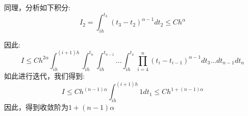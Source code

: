 \documentclass[12pt,final]{article}
\makeatletter
\numberwithin{equation}{section}
\numberwithin{figure}{section}
\numberwithin{table}{section}
\theoremstyle{plain}
\renewcommand{\proofname}{proof}
\theoremstyle{definition}
\theoremstyle{remark}
\renewenvironment{proof}[1][\proofname]{\par
  \pushQED{\qed}%
  \normalfont \topsep6\p@\@plus6\p@\relax
  \trivlist\item[\hskip\labelsep
  \bfseries #1\@addpunct{\,:\,}]\ignorespaces
}{%
  \popQED\endtrivlist\@endpefalse
}
\makeatother
\begin{document}
\begin{proof}
	同理，分析如下积分:
	\begin{equation*}
		I_{2} = \int_{ih}^{t_{3}}(t_{3}-t_{2})^{\alpha -1}
		dt_{2} \le Ch^\alpha 
	\end{equation*}
	
	因此:
	\begin{equation*}
		I \le Ch^{2\alpha}
		\int_{ih}^{(i+1)h}\int_{ih}^{t_n}\int_{ih}^{t_{n-1}} \ldots \int_{ih}^{t_{4}} 
		\prod_{i=4}^{n}(t_i-t_{i-1})^{\alpha -1} dt_{3} \ldots dt_{n-1}dt_n
	\end{equation*}
	如此进行迭代，我们得到:
	\begin{equation*}
		I \le Ch^{(n-1)\alpha}\int_{ih}^{(i+1)h} 1 dt_1 \le Ch^{1+(n-1)\alpha}
	\end{equation*}
	因此，得到收敛阶为$1+(n-1)\alpha$
\end{proof}
\end{document}
